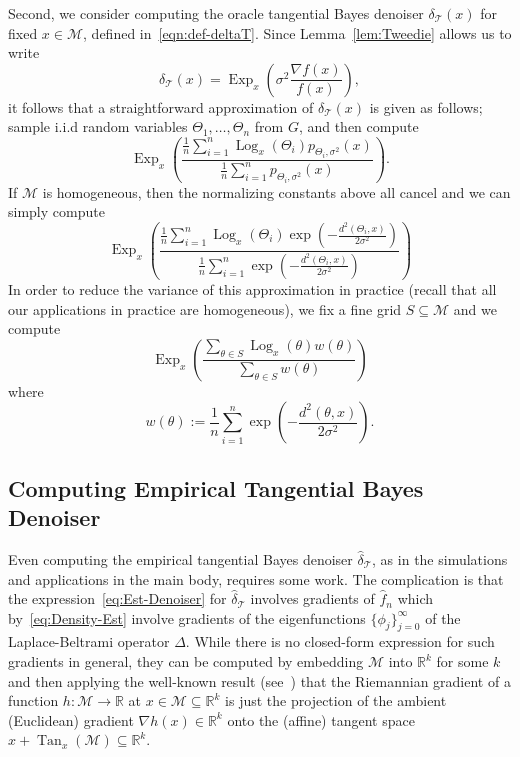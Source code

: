 \documentclass[preprint]{imsart}
\theoremstyle{plain}
\theoremstyle{definition}
\newcommand{\Rbb}{\mathbb{R}}
\newcommand{\Mcal}{\mathcal{M}}
\DeclareMathOperator{\Tan}{Tan}
\newcommand{\T}{\mathcal{T}}
\DeclareMathOperator{\Log}{Log}
\DeclareMathOperator{\Exp}{Exp}
\begin{document}
\begin{appendix}
Second, we consider computing the oracle tangential Bayes denoiser $\delta_{\T}(x)$ for fixed $x\in\Mcal$, defined in~\eqref{eqn:def-deltaT}.
Since Lemma~\ref{lem:Tweedie} allows us to write
\begin{equation*}
    \delta_{\T}(x) = \Exp_x\left(\sigma^2\frac{\nabla f(x)}{f(x)}\right),
\end{equation*}
it follows that a straightforward approximation of $\delta_{\T}(x)$ is given as follows; sample i.i.d random variables $\Theta_1,\ldots, \Theta_n$ from $G$, and then compute
\begin{equation*}
    \Exp_x\left(\frac{\frac{1}{n}\sum_{i=1}^{n}\Log_x(\Theta_i)p_{\Theta_i,\sigma^2}(x)}{\frac{1}{n}\sum_{i=1}^{n}p_{\Theta_i,\sigma^2}(x)}\right).
\end{equation*}
If $\Mcal$ is homogeneous, then the normalizing constants above all cancel and we can simply compute
\begin{equation*}
    \Exp_x\left(\frac{\frac{1}{n}\sum_{i=1}^{n}\Log_x(\Theta_i)\exp\left(-\frac{d^2(\Theta_i,x)}{2\sigma^2}\right)}{\frac{1}{n}\sum_{i=1}^{n}\exp\left(-\frac{d^2(\Theta_i,x)}{2\sigma^2}\right)}\right)
\end{equation*}
In order to reduce the variance of this approximation in practice (recall that all our applications in practice are homogeneous), we fix a fine grid $S\subseteq\Mcal$ and we compute
\begin{equation*}
    \Exp_x\left(\frac{\sum_{\theta\in S}\Log_x(\theta)w(\theta)}{\sum_{\theta\in S}w(\theta)}\right)
\end{equation*}
where
\begin{equation*}
    w(\theta) := \frac{1}{n}\sum_{i=1}^{n}\exp\left(-\frac{d^2(\theta,x)}{2\sigma^2}\right).
\end{equation*}

\subsection{Computing Empirical Tangential Bayes Denoiser}\label{subsec:compute-empirical}

Even computing the empirical tangential Bayes denoiser $\hat{\delta}_{\T}$, as in the simulations and applications in the main body, requires some work.
The complication is that the expression~\eqref{eq:Est-Denoiser} for $\hat{\delta}_{\T}$ involves gradients of $\hat{f}_n$ which by~\eqref{eq:Density-Est} involve gradients of the eigenfunctions $\{\phi_j\}_{j=0}^{\infty}$ of the Laplace-Beltrami operator $\Delta$.
While there is no closed-form expression for such gradients in general, they can be computed by embedding $\Mcal$ into $\Rbb^k$ for some $k$ and then applying the well-known result (see~\cite[Chapter~3]{Boumal}) that the Riemannian gradient of a function $h:\Mcal\to\Rbb$ at $x\in\Mcal\subseteq\Rbb^k$ is just the projection of the ambient (Euclidean) gradient $\nabla h(x)\in\Rbb^k$ onto the (affine) tangent space $x+\Tan_x(\Mcal)\subseteq\Rbb^k$.


\end{appendix}
\end{document}
